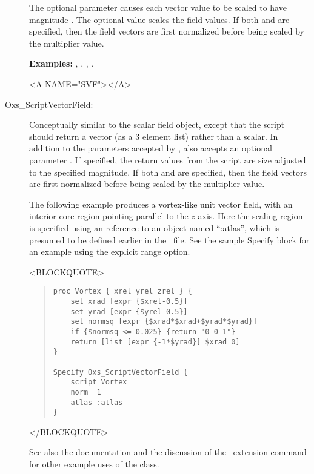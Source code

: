 \begin{description}
   The optional  parameter causes each vector value to be
   scaled to have magnitude .  The optional
    value scales the field values.  If both
    and  are specified, then the field vectors
   are first normalized before being scaled by the multiplier value.

\textbf{Examples:} , ,
, .

\begin{rawhtml}<A NAME="SVF"></A>\end{rawhtml}%
%
\item[Oxs\_ScriptVectorField:\label{item:ScriptVectorField}]
Conceptually similar to the
 scalar
field object,
except that the script should return a vector (as a 3 element list)
rather than a scalar.  In addition to the parameters accepted by
,  also accepts
an optional parameter .  If specified, the return
values from the script are size adjusted to the specified magnitude.
If both  and  are specified, then
the field vectors are first normalized before being scaled by the
multiplier value.

The following example produces a vortex-like unit vector field, with
an interior core region pointing parallel to the $z$-axis.  Here the
scaling region is specified using an  reference to an
object named ``:atlas'', which is presumed to be defined earlier in
the \MIF\ file.  See the  sample Specify
block for an example using the explicit range option.
\begin{rawhtml}<BLOCKQUOTE>\end{rawhtml}
\begin{quote}
\begin{verbatim}
proc Vortex { xrel yrel zrel } {
    set xrad [expr {$xrel-0.5}]
    set yrad [expr {$yrel-0.5}]
    set normsq [expr {$xrad*$xrad+$yrad*$yrad}]
    if {$normsq <= 0.025} {return "0 0 1"}
    return [list [expr {-1*$yrad}] $xrad 0]
}

Specify Oxs_ScriptVectorField {
    script Vortex
    norm  1
    atlas :atlas
}
\end{verbatim}
\end{quote}
\begin{rawhtml}</BLOCKQUOTE>\end{rawhtml}
See also the
documentation and the discussion of the
 \MIF\ extension command
for other example uses of the  class.


\end{description}
